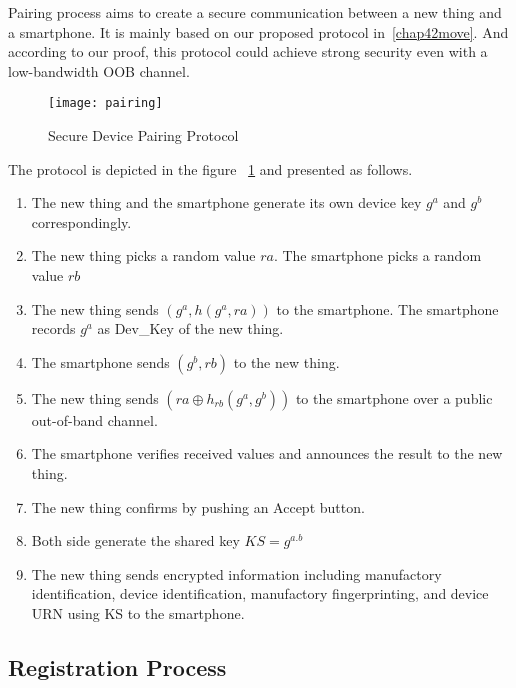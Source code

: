 Pairing process aims to create a secure communication between a new thing and a smartphone. It is mainly based on our proposed protocol in~\ref{chap42move}. And according to our proof, this protocol could achieve strong security even with a low-bandwidth OOB channel. 

\begin{figure}
  \centering
  \texttt{[image: pairing]}
  \caption{Secure Device Pairing Protocol}
  \label{devicepairing}
\end{figure}

The protocol is depicted in the figure ~\ref{devicepairing} and presented as follows. 
\begin{enumerate}
\item The new thing and the smartphone generate its own device key $g^a$ and $g^b$ correspondingly. 
\item The new thing picks a random value $ra$. The smartphone picks a random value $rb$
\item The new thing sends $(g^a,h(g^a,ra))$ to the smartphone. The smartphone records $g^a$ as Dev\_Key of the new thing. 
\item The smartphone sends $(g^b,rb)$ to the new thing.
\item The new thing sends $(ra \oplus h_{rb}(g^a,g^b) )$ to the smartphone over a public out-of-band channel. 
\item The smartphone verifies received values and announces the result to the new thing. 
\item The new thing confirms by pushing an Accept button. 
\item Both side generate the shared key $KS = g^{a.b}$
\item The new thing sends encrypted information including manufactory identification, device identification, manufactory fingerprinting, and device URN using KS to the smartphone. 
\end{enumerate}

\subsection{Registration Process}

